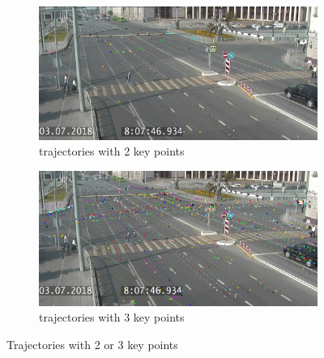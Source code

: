\begin{figure}[!htb]
	\centering
	\begin{subfigure}[!htb]{0.48\textwidth}
		\centering{}
		\includegraphics[width=\textwidth]{images/2-kp.png}
		\caption{trajectories with 2 key points}
	\end{subfigure}
	\hfill
	\begin{subfigure}[!htb]{0.48\textwidth}
		\centering{}
		\includegraphics[width=\textwidth]{images/3-kp.png}
		\caption{trajectories with 3 key points}
	\end{subfigure}	
	\caption{Trajectories with 2 or 3 key points}
	\label{fig:2-3-kp}
\end{figure}

